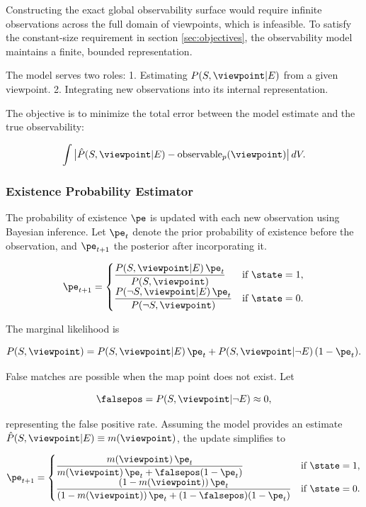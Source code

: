 Constructing the exact global observability surface would require infinite observations across the full domain of viewpoints, which is infeasible. To satisfy the constant-size requirement in section \ref{sec:objectives}, the observability model maintains a finite, bounded representation.

The model serves two roles:
1. Estimating $P(S,\viewpoint|E)$ from a given viewpoint.
2. Integrating new observations into its internal representation.

The objective is to minimize the total error between the model estimate and the true observability:

\[
    \int \big| \hat{P}(S,\viewpoint|E) - \operatorname{observable}_p(\viewpoint) \big| \, dV.
\]

\subsubsection{Existence Probability Estimator}

The probability of existence $\pe$ is updated with each new observation using Bayesian inference. Let $\pe_t$ denote the prior probability of existence before the observation, and $\pe_{t+1}$ the posterior after incorporating it.

\[
    \pe_{t+1} =
    \begin{cases}
        \dfrac{P(S,\viewpoint|E)\,\pe_t}{P(S,\viewpoint)}             & \text{if } \state=1, \\[1.2ex]
        \dfrac{P(\lnot S,\viewpoint|E)\,\pe_t}{P(\lnot S,\viewpoint)} & \text{if } \state=0.
    \end{cases}
\]

The marginal likelihood is

\[
    P(S,\viewpoint) = P(S,\viewpoint|E)\,\pe_t + P(S,\viewpoint|\lnot E)\,(1-\pe_t).
\]

False matches are possible when the map point does not exist. Let

\[
    \falsepos = P(S,\viewpoint|\lnot E) \approx 0,
\]

representing the false positive rate.
Assuming the model provides an estimate $\hat{P}(S,\viewpoint|E) \equiv m(\viewpoint)$, the update simplifies to

\[
    \pe_{t+1} =
    \begin{cases}
        \dfrac{m(\viewpoint)\,\pe_t}{m(\viewpoint)\,\pe_t + \falsepos(1-\pe_t)}             & \text{if } \state=1, \\[1.2ex]
        \dfrac{(1-m(\viewpoint))\,\pe_t}{(1-m(\viewpoint))\,\pe_t + (1-\falsepos)(1-\pe_t)} & \text{if } \state=0.
    \end{cases}
\]

